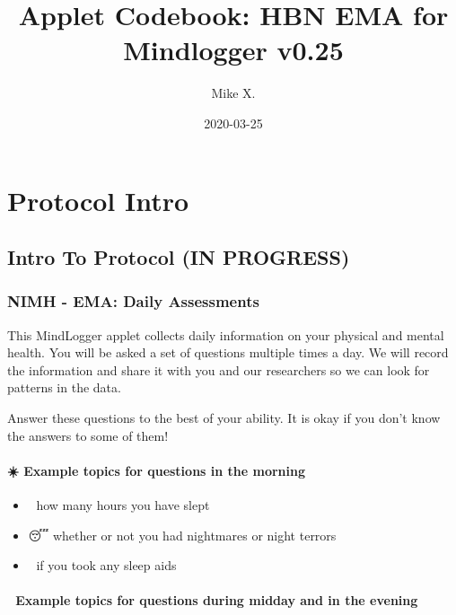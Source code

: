 \documentclass[]{book}
\title{Applet Codebook: HBN EMA for Mindlogger v0.25}
\author{Mike X.}
\date{2020-03-25}
\providecommand{\tightlist}{%
  \setlength{\itemsep}{0pt}\setlength{\parskip}{0pt}}
\begin{document}
\maketitle

{
\setcounter{tocdepth}{1}
\tableofcontents
}
\hypertarget{part-protocol-intro}{%
\part{Protocol Intro}\label{part-protocol-intro}}

\hypertarget{intro}{%
\chapter*{Intro To Protocol (IN PROGRESS)}\label{intro}}

\hypertarget{nimh---ema-daily-assessments}{%
\section{NIMH - EMA: Daily Assessments}\label{nimh---ema-daily-assessments}}

This MindLogger applet collects daily information on your physical and mental health.
You will be asked a set of questions multiple times a day. We will record the information and share it with you and our researchers so we can look for patterns in the data.

Answer these questions to the best of your ability. It is okay if you don't know the answers to some of them!

\hypertarget{example-topics-for-questions-in-the-morning}{%
\subsection{☀️ Example topics for questions in the morning}\label{example-topics-for-questions-in-the-morning}}

\begin{itemize}
\tightlist
\item
  🛌 how many hours you have slept
\item
  😴 whether or not you had nightmares or night terrors
\item
  💊 if you took any sleep aids
\end{itemize}

\hypertarget{example-topics-for-questions-during-midday-and-in-the-evening}{%
\subsection{🌙 Example topics for questions during midday and in the evening}\label{example-topics-for-questions-during-midday-and-in-the-evening}}
\end{document}
